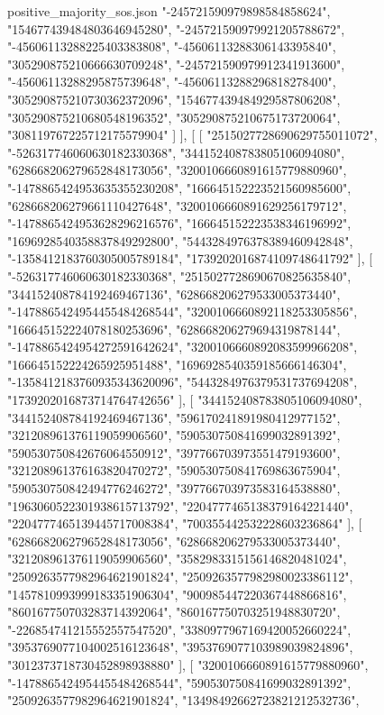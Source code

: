 \begin{filecontents*}[overwrite]{positive_majority_sos.json}
    "-245721590979898584858624",
    "154677439484803646945280",
    "-245721590979921205788672",
    "-45606113288225403383808",
    "-45606113288306143395840",
    "305290875210666630709248",
    "-245721590979912341913600",
    "-45606113288295875739648",
    "-45606113288296818278400",
    "305290875210730362372096",
    "154677439484929587806208",
    "305290875210680548196352",
    "305290875210675173720064",
    "308119767225712175579904"
   ]
  ],
  [
   [
    "2515027728690629755011072",
    "-526317746060630182330368",
    "344152408783805106094080",
    "628668206279652848173056",
    "3200106660891615779880960",
    "-1478865424953635355230208",
    "166645152223521560985600",
    "628668206279661110427648",
    "3200106660891629256179712",
    "-1478865424953628296216576",
    "166645152223538346196992",
    "1696928540358837849292800",
    "5443284976378389460942848",
    "-1358412183760305005789184",
    "1739202016874109748641792"
   ],
   [
    "-526317746060630182330368",
    "2515027728690670825635840",
    "344152408784192469467136",
    "628668206279533005373440",
    "-1478865424954455484268544",
    "3200106660892118253305856",
    "166645152224078180253696",
    "628668206279694319878144",
    "-1478865424954272591642624",
    "3200106660892083599966208",
    "166645152224265925951488",
    "1696928540359185666146304",
    "-1358412183760935343620096",
    "5443284976379531737694208",
    "1739202016873714764742656"
   ],
   [
    "344152408783805106094080",
    "344152408784192469467136",
    "596170241891980412977152",
    "321208961376119059906560",
    "590530750841699032891392",
    "590530750842676064550912",
    "397766703973551479193600",
    "321208961376163820470272",
    "590530750841769863675904",
    "590530750842494776246272",
    "397766703973583164538880",
    "1963060522301938615713792",
    "2204777465138379164221440",
    "2204777465139445717008384",
    "700355442532228603236864"
   ],
   [
    "628668206279652848173056",
    "628668206279533005373440",
    "321208961376119059906560",
    "3582983315156146820481024",
    "2509263577982964621901824",
    "2509263577982980023386112",
    "1457810993999183351906304",
    "900985447220367448866816",
    "860167750703283714392064",
    "860167750703251948830720",
    "-226854741215552557547520",
    "3380977967169420052660224",
    "3953769077104002516123648",
    "3953769077103989039824896",
    "3012373718730452898938880"
   ],
   [
    "3200106660891615779880960",
    "-1478865424954455484268544",
    "590530750841699032891392",
    "2509263577982964621901824",
    "13498492662723821212532736",

\end{filecontents*}
